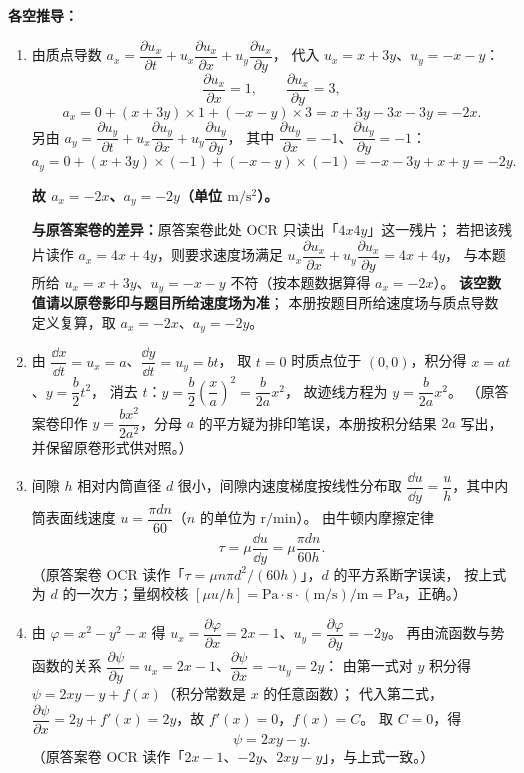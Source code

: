 \begin{tishi}
\textbf{各空推导：}
\begin{enumerate}
  \item 由质点导数
        $a_x=\dfrac{\partial u_x}{\partial t}+u_x\dfrac{\partial u_x}{\partial x}+u_y\dfrac{\partial u_x}{\partial y}$，
        代入 $u_x=x+3y$、$u_y=-x-y$：
        \[
        \frac{\partial u_x}{\partial x}=1,\qquad \frac{\partial u_x}{\partial y}=3,
        \]
        \[
        a_x=0+(x+3y)\times1+(-x-y)\times3=x+3y-3x-3y=-2x .
        \]
        另由
        $a_y=\dfrac{\partial u_y}{\partial t}+u_x\dfrac{\partial u_y}{\partial x}+u_y\dfrac{\partial u_y}{\partial y}$，
        其中 $\dfrac{\partial u_y}{\partial x}=-1$、$\dfrac{\partial u_y}{\partial y}=-1$：
        \[
        a_y=0+(x+3y)\times(-1)+(-x-y)\times(-1)=-x-3y+x+y=-2y .
        \]

        \textbf{故 $a_x=-2x$、$a_y=-2y$（单位 $\mathrm{m/s^2}$）。}

        \textbf{与原答案卷的差异：}原答案卷此处 OCR 只读出「$4x4y$」这一残片；
        若把该残片读作 $a_x=4x+4y$，则要求速度场满足
        $u_x\dfrac{\partial u_x}{\partial x}+u_y\dfrac{\partial u_x}{\partial y}=4x+4y$，
        与本题所给 $u_x=x+3y$、$u_y=-x-y$ 不符（按本题数据算得 $a_x=-2x$）。
        \textbf{该空数值请以原卷影印与题目所给速度场为准}；
        本册按题目所给速度场与质点导数定义复算，取 $a_x=-2x$、$a_y=-2y$。

  \item 由 $\dfrac{\dd x}{\dd t}=u_x=a$、$\dfrac{\dd y}{\dd t}=u_y=bt$，
        取 $t=0$ 时质点位于 $(0,0)$，积分得 $x=at$、$y=\dfrac{b}{2}t^{2}$，
        消去 $t$：$y=\dfrac{b}{2}\left(\dfrac{x}{a}\right)^{2}=\dfrac{b}{2a}x^{2}$，
        故迹线方程为 $y=\dfrac{b}{2a}x^{2}$。
        （原答案卷印作 $y=\dfrac{bx^{2}}{2a^{2}}$，分母 $a$ 的平方疑为排印笔误，本册按积分结果 $2a$ 写出，
        并保留原卷形式供对照。）

  \item 间隙 $h$ 相对内筒直径 $d$ 很小，间隙内速度梯度按线性分布取
        $\dfrac{\dd u}{\dd y}=\dfrac{u}{h}$，其中内筒表面线速度 $u=\dfrac{\pi dn}{60}$（$n$ 的单位为 $\mathrm{r/min}$）。
        由牛顿内摩擦定律
        \[
        \tau=\mu\frac{\dd u}{\dd y}=\mu\frac{\pi dn}{60h}.
        \]
        （原答案卷 OCR 读作「$\tau=\mu n\pi d^{2}/(60h)$」，$d$ 的平方系断字误读，
        按上式为 $d$ 的一次方；量纲校核 $[\mu u/h]=\mathrm{Pa\cdot s}\cdot\mathrm{(m/s)/m}=\mathrm{Pa}$，正确。）

  \item 由 $\varphi=x^{2}-y^{2}-x$ 得
        $u_x=\dfrac{\partial\varphi}{\partial x}=2x-1$、$u_y=\dfrac{\partial\varphi}{\partial y}=-2y$。
        再由流函数与势函数的关系 $\dfrac{\partial\psi}{\partial y}=u_x=2x-1$、$\dfrac{\partial\psi}{\partial x}=-u_y=2y$：
        由第一式对 $y$ 积分得 $\psi=2xy-y+f(x)$（积分常数是 $x$ 的任意函数）；
        代入第二式，$\dfrac{\partial\psi}{\partial x}=2y+f'(x)=2y$，故 $f'(x)=0$，$f(x)=C$。
        取 $C=0$，得
        \[
        \psi=2xy-y .
        \]
        （原答案卷 OCR 读作「$2x-1$、$-2y$、$2xy-y$」，与上式一致。）


\end{enumerate}
\end{tishi}
